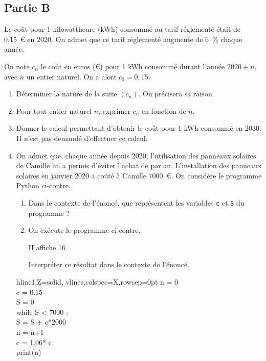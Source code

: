 \subsection*{Partie B}
Le coût pour 1 kilowattheure (kWh) consommé au tarif réglementé était de 0,15~\euro{} en 2020. On admet que ce tarif réglementé augmente de 6~\% chaque année.

On note $c_{n}$ le coût en euros (\euro{}) pour 1 kWh consommé durant l'année $2020+n$, avec $n$ un entier naturel. On a alors $c_{0}=0,15$.

\begin{enumerate}
	\item Déterminer la nature de la suite $\left(c_{n}\right)$. On précisera sa raison.

	\item Pour tout entier naturel $n$, exprimer $c_{n}$ en fonction de $n$.

	\item Donner le calcul permettant d'obtenir le coût pour 1 kWh consommé en 2030. II n'est pas demandé d'effectuer ce calcul.

	\item On admet que, chaque année depuis 2020, l'utilisation des panneaux solaires de Camille lui a permis d'éviter l'achat de  par an.
	L'installation des panneaux solaires en janvier 2020 a coûté à Camille 7000~\euro{}.
	On considère le programme Python ci-contre.

	\begin{minipage}{0.5\linewidth}
		\begin{enumerate}
			\item Dans le contexte de l'énoncé, que représentent les variables \texttt{c} et \texttt{S} du programme ?

			\item On exécute le programme ci-contre.

			II affiche 16.

			Interpréter ce résultat dans le contexte de l'énoncé.
		\end{enumerate}
	\end{minipage}
\hfill
\begin{minipage}{0.37\linewidth}
\hfill
\begin{ttfamily}
\begin{tblr}{hline{1,Z}={solid}, vlines,colspec={X},rowsep=0pt}
	n = 0\\
	c = 0.15\\
	S = 0\\
	while S < 7000 :\\
	\qquad S = S + c*2000\\
	\qquad n = n+1\\
	\qquad c = 1.06* c\\
	print(n)\\
\end{tblr}
\end{ttfamily}
\end{minipage}
\hfill~
\end{enumerate}
